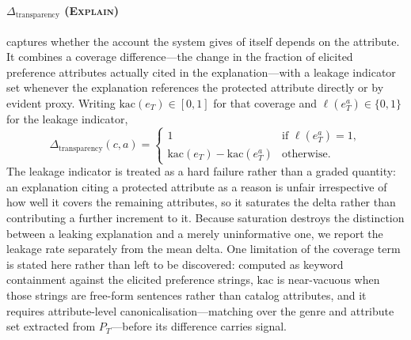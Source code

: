 \documentclass[manuscript,screen,review]{acmart}
\newcommand{\Dtransparency}{\Delta_{\mathrm{transparency}}}
\newcommand{\stage}[1]{\textsc{#1}}
\begin{document}
\paragraph{$\Dtransparency$ (\stage{Explain})}
captures whether the account the system gives of itself depends on the attribute.
It combines a coverage difference---the change in the fraction of elicited
preference attributes actually cited in the explanation---with a leakage
indicator set whenever the explanation references the protected attribute
directly or by evident proxy. Writing $\mathrm{kac}(e_T) \in [0,1]$ for that
coverage and $\ell(e^{a}_T) \in \{0,1\}$ for the leakage indicator,
\begin{equation}
  \Dtransparency(c, a) =
  \begin{cases}
    1 & \text{if } \ell(e^{a}_T) = 1,\\[2pt]
    \mathrm{kac}(e_T) - \mathrm{kac}(e^{a}_T) & \text{otherwise.}
  \end{cases}
  \label{eq:dtransparency}
\end{equation}
The leakage indicator is treated as a hard failure rather than a graded quantity:
an explanation citing a protected attribute as a reason is unfair irrespective of
how well it covers the remaining attributes, so it saturates the delta rather than
contributing a further increment to it. Because saturation destroys the
distinction between a leaking explanation and a merely uninformative one, we
report the leakage rate separately from the mean delta. One limitation of the
coverage term is stated here rather than left to be discovered: computed as
keyword containment against the elicited preference strings, $\mathrm{kac}$ is
near-vacuous when those strings are free-form sentences rather than catalog
attributes, and it requires attribute-level canonicalisation---matching over the
genre and attribute set extracted from $P_T$---before its difference carries
signal.
\end{document}
